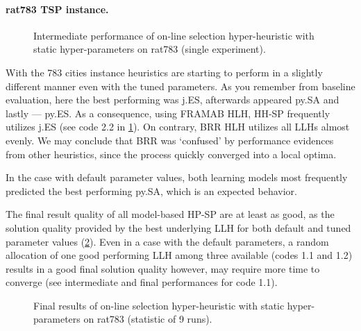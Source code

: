 \paragraph{rat783 TSP instance.}
\begin{figure}[t]
	\centering
	\vspace{-20pt}
	
	\caption{Intermediate performance of on-line selection hyper-heuristic with static hyper-parameters on rat783 (single experiment).}
	\vspace{-10pt}
	\label{eval:pict:hh-sp:rat783 intermediate}
\end{figure}
With the 783 cities instance heuristics are starting to perform in a slightly different manner even with the tuned parameters. As you remember from baseline evaluation, here the best performing was j.ES, afterwards appeared py.SA and lastly — py.ES. As a consequence, using FRAMAB HLH, HH-SP frequently utilizes j.ES (see code 2.2 in \cref{eval:pict:hh-sp:rat783 intermediate}). On contrary, BRR HLH utilizes all LLHs almost evenly. We may conclude that BRR was `confused' by performance evidences from other heuristics, since the process quickly converged into a local optima.

In the case with default parameter values, both learning models most frequently predicted the best performing py.SA, which is an expected behavior.

The final result quality of all model-based HP-SP are at least as good, as the solution quality provided by the best underlying LLH for both default and tuned parameter values (\cref{eval:pict:hh-sp:rat783 final}). Even in a case with the default parameters, a random allocation of one good performing LLH among three available (codes 1.1 and 1.2) results in a good final solution quality however, may require more time to converge (see intermediate and final performances for code 1.1).

\begin{figure}[b]
	\centering
	\vspace{-20pt}
	
	\caption{Final results of on-line selection hyper-heuristic with static hyper-parameters on rat783 (statistic of 9 runs).}
	\vspace{-5pt}
	\label{eval:pict:hh-sp:rat783 final}
\end{figure}

\newpage
